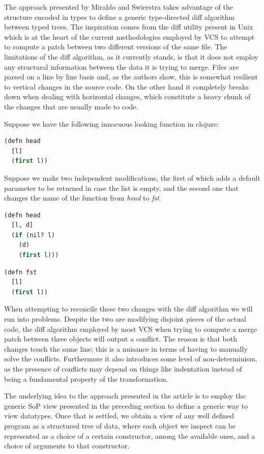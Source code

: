 \documentclass[11pt]{article}
\begin{document}
The approach presented by Miraldo and Swierstra \cite{type-directed-diff} takes advantage of the structure 
encoded in types to define a generic type-directed diff algorithm between
typed trees. The inspiration comes from the diff utility present in
Unix which is at the heart of the current methodologies employed by VCS
to attempt to compute a patch between two different versions of the same
file. The limitations of the diff algorithm, as it currently stands, is
that it does not employ any structural information between the data it
is trying to merge. Files are parsed on a line by line basis and, as
the authors show, this is somewhat resilient to vertical changes in the
source code. On the other hand it completely breaks down when dealing with horizontal
changes, which constitute a heavy chunk of the changes that are usually
made to code.

Suppose we have the following innocuous looking function in clojure:

\begin{lstlisting}[language=lisp]
(defn head
  [l]
  (first l))
\end{lstlisting}

Suppose we make two independent modifications, the first of which adds a default 
parameter to be returned in case the list is empty, and the second one that 
changes the name of the function from \emph{head} to \emph{fst}.

\begin{lstlisting}[language=lisp]
(defn head
  [l, d]
  (if (nil? l)
    (d)
    (first l)))
\end{lstlisting}

\begin{lstlisting}[language=lisp]
(defn fst
  [l]
  (first l))
\end{lstlisting}

When attempting to reconcile these two changes with the diff algorithm we will run into problems.
Despite the two are modifying disjoint pieces of the 
actual code, the diff algorithm employed by most VCS when trying to 
compute a merge patch between three objects will output a conflict. 
The reason is that both changes touch the same line; this is a nuisance in  
terms of having to manually solve the conflicts. Furthermore it also 
introduces some level of non-determinism, as the presence of conflicts may depend on 
things like indentation instead of being a fundamental property of the 
transformation. 

The underlying idea to the approach presented in the article is to employ
the generic SoP view presented in the preceding section to define a
generic way to view datatypes. Once that is settled, we obtain a view of
any well defined program as a structured tree of data, where each object
we inspect can be represented as a choice of a certain constructor,
among the available ones, and a choice of arguments to that constructor.
\end{document}
